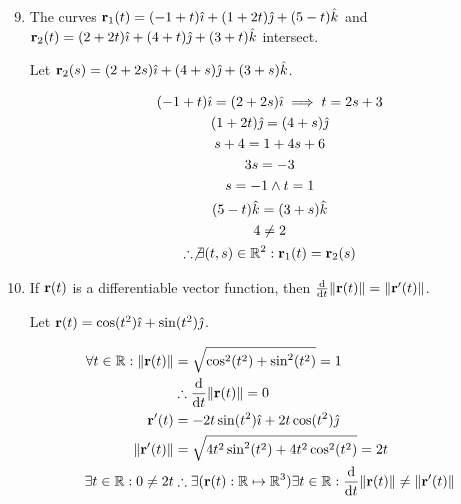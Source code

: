 \documentclass[11pt]{article}
\renewcommand{\vec}[1]{\ensuremath\mathbf{#1}}
\begin{document}
\begin{enumerate}
  \setcounter{enumi}{8}
\item The curves \(\vec{r}_1(t) = (-1 + t)\hat{\imath} + (1 + 2t)\hat{\jmath} +
  (5 - t)\hat{k}\) and \(\vec{r}_2(t) = (2 + 2t)\hat{\imath} + (4 +
  t)\hat{\jmath} + (3 + t)\hat{k}\) intersect.

  Let \(\vec{r}_2(s) = (2 + 2s)\hat{\imath} + (4 + s)\hat{\jmath} + (3 +
  s)\hat{k}\).

  \begin{equation*}
    \begin{gathered}
      (-1 + t)\hat{\imath} = (2 + 2s)\hat{\imath} \implies t = 2s + 3 \\
      (1 + 2t)\hat{\jmath} = (4 + s)\hat{\jmath} \\
      s + 4 = 1 + 4s + 6 \\
      3s = -3 \\
      s = -1 \land t = 1 \\
      (5 - t)\hat{k} = (3 + s)\hat{k} \\
      4 \neq 2 \\
      \therefore \not\exists(t, s) \in \mathbb{R}^2 : \vec{r}_1(t) = \vec{r}_2(s)
    \end{gathered}
  \end{equation*}

\item If \(\vec{r}(t)\) is a differentiable vector function, then
  \(\frac{\mathrm{d}}{\mathrm{d}t} \lVert \vec{r}(t) \rVert = \lVert
  \vec{r}'(t) \rVert\). \label{proof10}

  Let \(\vec{r}(t) = \cos(t^2)\hat{\imath} + \sin(t^2)\hat{\jmath}\).

  \begin{align*}
    \forall t \in \mathbb{R} : \lVert \vec{r}(t) \rVert
    &= \sqrt{\cos^2(t^2) + \sin^2(t^2)} = 1 \\
    &\therefore \frac{\mathrm{d}}{\mathrm{d}t} \lVert \vec{r}(t) \rVert = 0 \\
    \vec{r}'(t)
    &= -2t \sin(t^2)\hat{\imath} + 2t\cos(t^2)\hat{\jmath} \\
    \lVert \vec{r}'(t) \rVert
    &= \sqrt{4t^2\sin^2(t^2) + 4t^2\cos^2(t^2)} = 2t \\
    \exists t \in \mathbb{R} : 0 \neq 2t
    &\therefore \exists(\vec{r}(t) : \mathbb{R} \mapsto \mathbb{R}^3) \exists
      t \in \mathbb{R} : \frac{\mathrm{d}}{\mathrm{d}t} \lVert \vec{r}(t)
      \rVert \neq \lVert \vec{r}'(t) \rVert
  \end{align*}


\end{enumerate}
\end{document}
